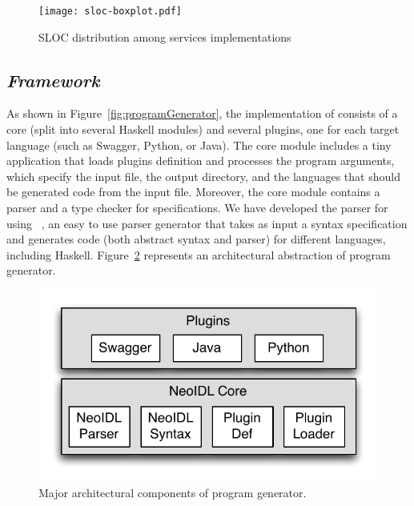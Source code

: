 \begin{figure}[thb]
\begin{center}
\vspace{-1cm}
\texttt{[image: sloc-boxplot.pdf]}
\vspace{-1.5cm}
\end{center}
\caption{SLOC distribution among services implementations}
\label{fig:sloc-boxplot}
\end{figure}










\subsection{\textit{Framework}}
\vspace{-6mm}


As shown in Figure~\ref{fig:programGenerator}, the implementation of \neoidl{}
consists of a core (split into several Haskell modules) and 
several plugins, one for each target language (such as Swagger,
Python, or Java). The core module includes a tiny application that loads 
plugins definition and processes the program arguments, which 
specify the input \neoidl{} file, the output directory, and the languages that should be generated code from the 
input file. Moreover, the core module contains a
parser and a type checker for \neoidl{} specifications. 
We have developed the parser for \neoidl{} using \bnfc~\cite{ranta-bnfc:2012}, 
an easy to use parser generator that takes as
input a syntax specification and generates code (both abstract syntax and
parser) for different languages, including Haskell. Figure~\ref{fig:neoidl-architecture}
represents an architectural abstraction of \neoidl{} program
generator. 

\begin{figure}[b]
\begin{center}
\includegraphics[scale=0.6]{neoidl.pdf}
\vspace{-.5cm}
\end{center}
\caption{Major architectural components of \neoidl{} program generator.}
\label{fig:neoidl-architecture} 
\end{figure}

